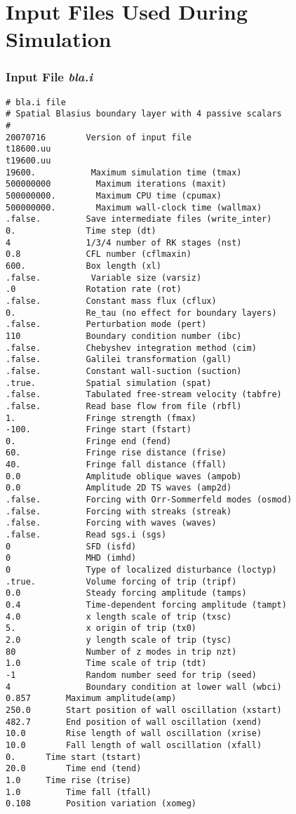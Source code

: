 \chapter{Input Files Used During Simulation}\label{app:input_files}
\subsection*{Input File \emph{bla.i}}
\begin{verbatim}
# bla.i file
# Spatial Blasius boundary layer with 4 passive scalars
#
20070716        Version of input file
t18600.uu
t19600.uu
19600.           Maximum simulation time (tmax)
500000000         Maximum iterations (maxit)
500000000.        Maximum CPU time (cpumax)
500000000.        Maximum wall-clock time (wallmax)
.false.         Save intermediate files (write_inter)
0.              Time step (dt)
4               1/3/4 number of RK stages (nst)
0.8             CFL number (cflmaxin)
600.            Box length (xl)
.false.          Variable size (varsiz)
.0              Rotation rate (rot)
.false.         Constant mass flux (cflux)
0.              Re_tau (no effect for boundary layers)
.false.         Perturbation mode (pert)
110             Boundary condition number (ibc)
.false.         Chebyshev integration method (cim)
.false.         Galilei transformation (gall)
.false.         Constant wall-suction (suction)
.true.          Spatial simulation (spat)
.false.         Tabulated free-stream velocity (tabfre)
.false.         Read base flow from file (rbfl)
1.              Fringe strength (fmax)
-100.           Fringe start (fstart)
0.              Fringe end (fend)
60.             Fringe rise distance (frise)
40.             Fringe fall distance (ffall)
0.0             Amplitude oblique waves (ampob)
0.0             Amplitude 2D TS waves (amp2d)
.false.         Forcing with Orr-Sommerfeld modes (osmod)
.false.         Forcing with streaks (streak)
.false.         Forcing with waves (waves)
.false.         Read sgs.i (sgs)
0               SFD (isfd)
0               MHD (imhd)
0               Type of localized disturbance (loctyp)
.true.          Volume forcing of trip (tripf)
0.0             Steady forcing amplitude (tamps)
0.4             Time-dependent forcing amplitude (tampt)
4.0             x length scale of trip (txsc)
5.              x origin of trip (tx0)
2.0             y length scale of trip (tysc)
80              Number of z modes in trip nzt)
1.0             Time scale of trip (tdt)
-1              Random number seed for trip (seed)
4               Boundary condition at lower wall (wbci)
0.857		Maximum amplitude(amp)
250.0		Start position of wall oscillation (xstart)
482.7		End position of wall oscillation (xend)
10.0		Rise length of wall oscillation (xrise)
10.0 		Fall length of wall oscillation (xfall)
0.		Time start (tstart)
20.0		Time end (tend)
1.0		Time rise (trise)
1.0 		Time fall (tfall)
0.108		Position variation (xomeg)


\end{verbatim}
